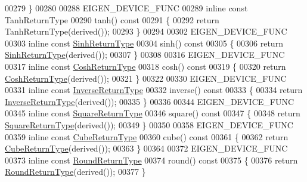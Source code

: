 \begin{DoxyCode}
00279 \}
00280 
00288 EIGEN\_DEVICE\_FUNC
00289 \textcolor{keyword}{inline} \textcolor{keyword}{const} TanhReturnType
00290 tanh()\textcolor{keyword}{ const}
00291 \textcolor{keyword}{}\{
00292   \textcolor{keywordflow}{return} TanhReturnType(derived());
00293 \}
00294 
00302 EIGEN\_DEVICE\_FUNC
00303 \textcolor{keyword}{inline} \textcolor{keyword}{const} \hyperlink{group___core___module_class_eigen_1_1_cwise_unary_op}{SinhReturnType}
00304 sinh()\textcolor{keyword}{ const}
00305 \textcolor{keyword}{}\{
00306   \textcolor{keywordflow}{return} \hyperlink{group___core___module_class_eigen_1_1_cwise_unary_op}{SinhReturnType}(derived());
00307 \}
00308 
00316 EIGEN\_DEVICE\_FUNC
00317 \textcolor{keyword}{inline} \textcolor{keyword}{const} \hyperlink{group___core___module_class_eigen_1_1_cwise_unary_op}{CoshReturnType}
00318 cosh()\textcolor{keyword}{ const}
00319 \textcolor{keyword}{}\{
00320   \textcolor{keywordflow}{return} \hyperlink{group___core___module_class_eigen_1_1_cwise_unary_op}{CoshReturnType}(derived());
00321 \}
00322 
00330 EIGEN\_DEVICE\_FUNC
00331 \textcolor{keyword}{inline} \textcolor{keyword}{const} \hyperlink{group___core___module_class_eigen_1_1_cwise_unary_op}{InverseReturnType}
00332 inverse()\textcolor{keyword}{ const}
00333 \textcolor{keyword}{}\{
00334   \textcolor{keywordflow}{return} \hyperlink{group___core___module_class_eigen_1_1_cwise_unary_op}{InverseReturnType}(derived());
00335 \}
00336 
00344 EIGEN\_DEVICE\_FUNC
00345 \textcolor{keyword}{inline} \textcolor{keyword}{const} \hyperlink{group___core___module_class_eigen_1_1_cwise_unary_op}{SquareReturnType}
00346 square()\textcolor{keyword}{ const}
00347 \textcolor{keyword}{}\{
00348   \textcolor{keywordflow}{return} \hyperlink{group___core___module_class_eigen_1_1_cwise_unary_op}{SquareReturnType}(derived());
00349 \}
00350 
00358 EIGEN\_DEVICE\_FUNC
00359 \textcolor{keyword}{inline} \textcolor{keyword}{const} \hyperlink{group___core___module_class_eigen_1_1_cwise_unary_op}{CubeReturnType}
00360 cube()\textcolor{keyword}{ const}
00361 \textcolor{keyword}{}\{
00362   \textcolor{keywordflow}{return} \hyperlink{group___core___module_class_eigen_1_1_cwise_unary_op}{CubeReturnType}(derived());
00363 \}
00364 
00372 EIGEN\_DEVICE\_FUNC
00373 \textcolor{keyword}{inline} \textcolor{keyword}{const} \hyperlink{group___core___module_class_eigen_1_1_cwise_unary_op}{RoundReturnType}
00374 round()\textcolor{keyword}{ const}
00375 \textcolor{keyword}{}\{
00376   \textcolor{keywordflow}{return} \hyperlink{group___core___module_class_eigen_1_1_cwise_unary_op}{RoundReturnType}(derived());
00377 \}

\end{DoxyCode}
